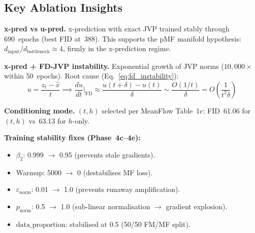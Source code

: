 \subsection{Key Ablation Insights}

\textbf{x-pred vs u-pred.}  x-prediction with exact JVP trained stably through
690~epochs (best FID at~388).  This supports the pMF manifold hypothesis:
$d_{\mathrm{input}}/d_{\mathrm{bottleneck}} \approx 4$, firmly in the
x-prediction regime.

\textbf{x-pred + FD-JVP instability.}  Exponential growth of JVP norms
($10{,}000\times$ within 50~epochs).  Root cause (Eq.~\ref{eq:fd_instability}):
\begin{equation}
  u = \frac{z_t - \hat{x}}{t} \implies
  \frac{du}{dt}\bigg|_{\mathrm{FD}}
    \approx \frac{u(t{+}\delta)-u(t)}{\delta}
    \sim \frac{O(1/t)}{\delta}
    = O\!\left(\frac{1}{t^2 \delta}\right)
\end{equation}

\textbf{Conditioning mode.}  $(t,h)$ selected per MeanFlow Table~1c: FID~61.06
for $(t,h)$ vs~63.13 for $h$-only.

\textbf{Training stability fixes (Phase~4c--4e):}
\begin{itemize}[nosep]
  \item $\beta_2$: 0.999 $\to$ 0.95 (prevents stale gradients).
  \item Warmup: 5000 $\to$ 0 (destabilises MF loss).
  \item $\varepsilon_{\mathrm{norm}}$: 0.01 $\to$ 1.0 (prevents runaway
        amplification).
  \item $p_{\mathrm{norm}}$: 0.5 $\to$ 1.0 (sub-linear normalisation
        $\to$ gradient explosion).
  \item $\mathrm{data\_proportion}$: stabilised at 0.5 (50/50 FM/MF split).
\end{itemize}
